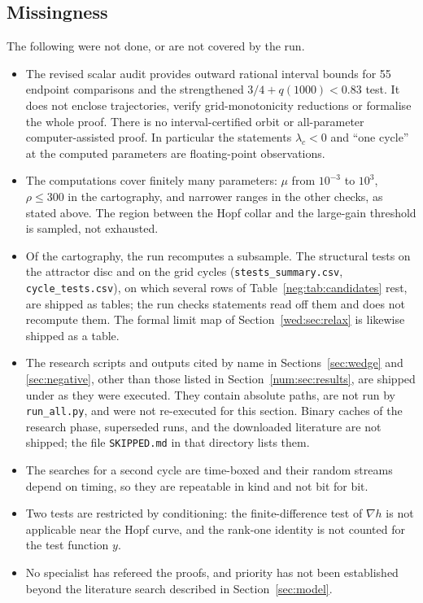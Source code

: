 \subsection{Missingness}\label{num:sec:missing}
The following were not done, or are not covered by the run.
\begin{itemize}
\item The revised scalar audit provides outward rational interval bounds for 55 endpoint comparisons and the strengthened $3/4+q(1000)<0.83$ test. It does not enclose trajectories, verify grid-monotonicity reductions or formalise the whole proof. There is no interval-certified orbit or all-parameter computer-assisted proof. In particular the statements $\lambda_c<0$ and ``one cycle'' at the computed parameters are floating-point observations.
\item The computations cover finitely many parameters: $\mu$ from $10^{-3}$ to $10^{3}$, $\rho\le300$ in the cartography, and narrower ranges in the other checks, as stated above. The region between the Hopf collar and the large-gain threshold is sampled, not exhausted.
\item Of the cartography, the run recomputes a subsample. The structural tests on the attractor disc and on the grid cycles (\texttt{stests\_summary.csv}, \texttt{cycle\_tests.csv}), on which several rows of Table~\ref{neg:tab:candidates} rest, are shipped as tables; the run checks statements read off them and does not recompute them. The formal limit map of Section~\ref{wed:sec:relax} is likewise shipped as a table.
\item The research scripts and outputs cited by name in Sections~\ref{sec:wedge} and \ref{sec:negative}, other than those listed in Section~\ref{num:sec:results}, are shipped under  as they were executed. They contain absolute paths, are not run by \texttt{run\_all.py}, and were not re-executed for this section. Binary caches of the research phase, superseded runs, and the downloaded literature are not shipped; the file \texttt{SKIPPED.md} in that directory lists them.
\item The searches for a second cycle are time-boxed and their random streams depend on timing, so they are repeatable in kind and not bit for bit.
\item Two tests are restricted by conditioning: the finite-difference test of $\nabla h$ is not applicable near the Hopf curve, and the rank-one identity is not counted for the test function $y$.
\item No specialist has refereed the proofs, and priority has not been established beyond the literature search described in Section~\ref{sec:model}.
\end{itemize}
